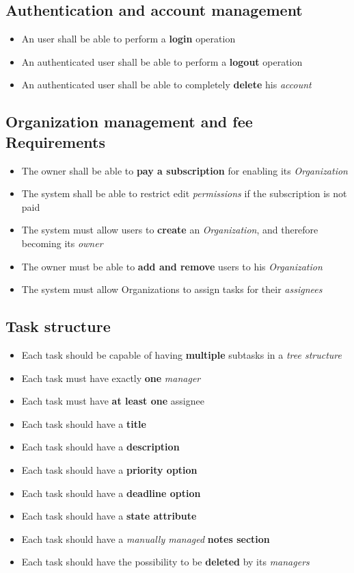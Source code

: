 \documentclass{article}
\begin{document}
\subsection{Authentication and account management}
\begin{itemize}
    \item An user shall be able to perform a \textbf{login} operation
    \item An authenticated user shall be able to perform a \textbf{logout} operation
    \item An authenticated user shall be able to completely \textbf{delete} his \textit{account}
\end{itemize}
\subsection{Organization management and fee Requirements}
\begin{itemize}
    \item The owner shall be able to \textbf{pay a subscription} for enabling its \textit{Organization}
    \item The system shall be able to restrict edit \textit{permissions} if the subscription is not paid
    \item The system must allow users to \textbf{create} an \textit{Organization}, and therefore becoming its \textit{owner}
    \item The owner must be able to \textbf{add and remove} users to his \textit{Organization}
    \item The system must allow Organizations to assign tasks for their \textit{assignees}
\end{itemize}
\subsection{Task structure}
\begin{itemize}
    \item Each task should be capable of having \textbf{multiple} subtasks in a \textit{tree structure}
    \item Each task must have exactly \textbf{one} \textit{manager}
    \item Each task must have \textbf{at least one} assignee
    \item Each task should have a \textbf{title}
    \item Each task should have a \textbf{description}
    \item Each task should have a \textbf{priority option}
    \item Each task should have a \textbf{deadline option}
    \item Each task should have a \textbf{state attribute}
    \item Each task should have a \textit{manually managed} \textbf{notes section}
    \item Each task should have the possibility to be \textbf{deleted} by its \textit{managers}
\end{itemize}
\end{document}
